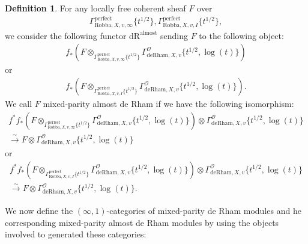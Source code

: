 \documentclass[12pt]{book}
\theoremstyle{definition}
\newtheorem{definition}{Definition}
\begin{document}
\begin{definition}
For any locally free coherent sheaf $F$ over
\begin{align}
\Gamma^\mathrm{perfect}_{\text{Robba},X,v,\infty}\{t^{1/2}\},\Gamma^\mathrm{perfect}_{\text{Robba},X,v,I}\{t^{1/2}\},
\end{align} 
we consider the following functor $\mathrm{dR}^\mathrm{almost}$ sending $F$ to the following object:
\begin{align}
f_*(F\otimes_{\Gamma^\mathrm{perfect}_{\text{Robba},X,v,\infty}\{t^{1/2}\}} \Gamma^\mathcal{O}_{\text{deRham},X,v}\{t^{1/2},\log(t)\})
\end{align}
or 
\begin{align}
f_*(F\otimes_{\Gamma^\mathrm{perfect}_{\text{Robba},X,v,I}\{t^{1/2}\}} \Gamma^\mathcal{O}_{\text{deRham},X,v}\{t^{1/2},\log(t)\}).
\end{align}
We call $F$ mixed-parity almost de Rham if we have the following isomorphism:
\begin{align}
f^*f_*(F\otimes_{\Gamma^\mathrm{perfect}_{\text{Robba},X,v,\infty}\{t^{1/2}\}} \Gamma^\mathcal{O}_{\text{deRham},X,v}\{t^{1/2},\log(t)\}) \otimes \Gamma^\mathcal{O}_{\text{deRham},X,v}\{t^{1/2},\log(t)\} \\
\overset{\sim}{\longrightarrow} F \otimes \Gamma^\mathcal{O}_{\text{deRham},X,v}\{t^{1/2},\log(t)\} 
\end{align}
or 
\begin{align}
f^*f_*(F\otimes_{\Gamma^\mathrm{perfect}_{\text{Robba},X,v,I}\{t^{1/2}\}} \Gamma^\mathcal{O}_{\text{deRham},X,v}\{t^{1/2},\log(t)\}) \otimes \Gamma^\mathcal{O}_{\text{deRham},X,v}\{t^{1/2},\log(t)\}\\ \overset{\sim}{\longrightarrow} F \otimes \Gamma^\mathcal{O}_{\text{deRham},X,v}\{t^{1/2},\log(t)\}. 
\end{align}
\end{definition}

\noindent We now define the $(\infty,1)$-categories of mixed-parity de Rham modules and he corresponding mixed-parity almost de Rham modules by using the objects involved to generated these categories:
\end{document}
